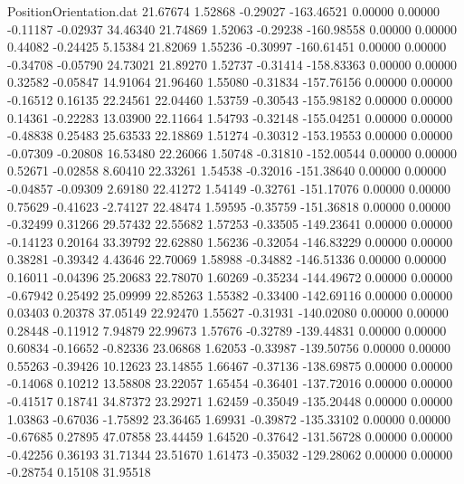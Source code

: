 \begin{filecontents}{PositionOrientation.dat}
  21.67674    1.52868   -0.29027  -163.46521    0.00000    0.00000   -0.11187   -0.02937   34.46340
  21.74869    1.52063   -0.29238  -160.98558    0.00000    0.00000    0.44082   -0.24425    5.15384
  21.82069    1.55236   -0.30997  -160.61451    0.00000    0.00000   -0.34708   -0.05790   24.73021
  21.89270    1.52737   -0.31414  -158.83363    0.00000    0.00000    0.32582   -0.05847   14.91064
  21.96460    1.55080   -0.31834  -157.76156    0.00000    0.00000   -0.16512    0.16135   22.24561
  22.04460    1.53759   -0.30543  -155.98182    0.00000    0.00000    0.14361   -0.22283   13.03900
  22.11664    1.54793   -0.32148  -155.04251    0.00000    0.00000   -0.48838    0.25483   25.63533
  22.18869    1.51274   -0.30312  -153.19553    0.00000    0.00000   -0.07309   -0.20808   16.53480
  22.26066    1.50748   -0.31810  -152.00544    0.00000    0.00000    0.52671   -0.02858    8.60410
  22.33261    1.54538   -0.32016  -151.38640    0.00000    0.00000   -0.04857   -0.09309    2.69180
  22.41272    1.54149   -0.32761  -151.17076    0.00000    0.00000    0.75629   -0.41623   -2.74127
  22.48474    1.59595   -0.35759  -151.36818    0.00000    0.00000   -0.32499    0.31266   29.57432
  22.55682    1.57253   -0.33505  -149.23641    0.00000    0.00000   -0.14123    0.20164   33.39792
  22.62880    1.56236   -0.32054  -146.83229    0.00000    0.00000    0.38281   -0.39342    4.43646
  22.70069    1.58988   -0.34882  -146.51336    0.00000    0.00000    0.16011   -0.04396   25.20683
  22.78070    1.60269   -0.35234  -144.49672    0.00000    0.00000   -0.67942    0.25492   25.09999
  22.85263    1.55382   -0.33400  -142.69116    0.00000    0.00000    0.03403    0.20378   37.05149
  22.92470    1.55627   -0.31931  -140.02080    0.00000    0.00000    0.28448   -0.11912    7.94879
  22.99673    1.57676   -0.32789  -139.44831    0.00000    0.00000    0.60834   -0.16652   -0.82336
  23.06868    1.62053   -0.33987  -139.50756    0.00000    0.00000    0.55263   -0.39426   10.12623
  23.14855    1.66467   -0.37136  -138.69875    0.00000    0.00000   -0.14068    0.10212   13.58808
  23.22057    1.65454   -0.36401  -137.72016    0.00000    0.00000   -0.41517    0.18741   34.87372
  23.29271    1.62459   -0.35049  -135.20448    0.00000    0.00000    1.03863   -0.67036   -1.75892
  23.36465    1.69931   -0.39872  -135.33102    0.00000    0.00000   -0.67685    0.27895   47.07858
  23.44459    1.64520   -0.37642  -131.56728    0.00000    0.00000   -0.42256    0.36193   31.71344
  23.51670    1.61473   -0.35032  -129.28062    0.00000    0.00000   -0.28754    0.15108   31.95518

\end{filecontents}
